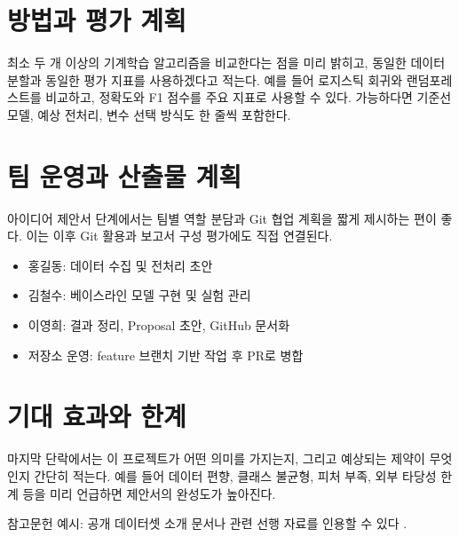 \documentclass[10pt,a4paper,twocolumn]{article}
\begin{document}
\section{방법과 평가 계획}
최소 두 개 이상의 기계학습 알고리즘을 비교한다는 점을 미리 밝히고, 동일한 데이터 분할과 동일한 평가 지표를 사용하겠다고 적는다. 예를 들어 로지스틱 회귀와 랜덤포레스트를 비교하고, 정확도와 F1 점수를 주요 지표로 사용할 수 있다. 가능하다면 기준선 모델, 예상 전처리, 변수 선택 방식도 한 줄씩 포함한다.

\section{팀 운영과 산출물 계획}
아이디어 제안서 단계에서는 팀별 역할 분담과 Git 협업 계획을 짧게 제시하는 편이 좋다. 이는 이후 Git 활용과 보고서 구성 평가에도 직접 연결된다.

\begin{itemize}[leftmargin=1.5em]
  \item 홍길동: 데이터 수집 및 전처리 초안
  \item 김철수: 베이스라인 모델 구현 및 실험 관리
  \item 이영희: 결과 정리, Proposal 초안, GitHub 문서화
  \item 저장소 운영: feature 브랜치 기반 작업 후 PR로 병합
\end{itemize}

\section{기대 효과와 한계}
마지막 단락에서는 이 프로젝트가 어떤 의미를 가지는지, 그리고 예상되는 제약이 무엇인지 간단히 적는다. 예를 들어 데이터 편향, 클래스 불균형, 피처 부족, 외부 타당성 한계 등을 미리 언급하면 제안서의 완성도가 높아진다.

참고문헌 예시: 공개 데이터셋 소개 문서나 관련 선행 자료를 인용할 수 있다 \cite{daudon2018recurrence}.



\end{document}
